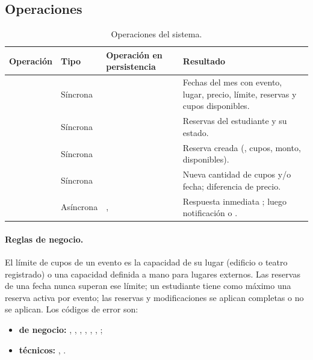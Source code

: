\subsection{Operaciones}

\begin{table}[H]
\centering
\caption{Operaciones del sistema.}
\label{tab:operaciones}
\small
\begin{tabularx}{\textwidth}{p{3.7cm}p{1.6cm}p{4.5cm}Y}
\toprule
Operación & Tipo & Operación en persistencia & Resultado \\
\midrule
{} & Síncrona &  &
Fechas del mes con evento, lugar, precio, límite, reservas y cupos disponibles. \\
 & Síncrona &  &
Reservas del estudiante y su estado. \\
 & Síncrona &  &
Reserva creada (, cupos, monto, disponibles). \\
 & Síncrona &  &
Nueva cantidad de cupos y/o fecha; diferencia de precio. \\
 & Asíncrona & ,
 & Respuesta inmediata ; luego
notificación  o . \\
\bottomrule
\end{tabularx}
\end{table}

\paragraph{Reglas de negocio.} El límite de cupos de un evento es la capacidad de su
lugar (edificio o teatro registrado) o una capacidad definida a mano para lugares
externos. Las reservas de una fecha nunca superan ese límite; un estudiante tiene
como máximo una reserva activa por evento; las reservas y modificaciones se
aplican completas o no se aplican. Los códigos de error son:

\begin{itemize}\sloppy
    \item \textbf{de negocio:} , ,
          , ,
          , ,
          ;
    \item \textbf{técnicos:} ,
          .
\end{itemize}

